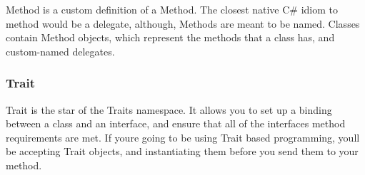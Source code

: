 Method is a custom definition of a Method. The closest native C\# idiom to method would be a {\ttfamily delegate}, although, Methods are meant to be named. Classes contain Method objects, which represent the methods that a class has, and custom-\/named delegates.

\subsubsection*{Trait}

Trait is the star of the Traits namespace. It allows you to set up a binding between a class and an interface, and ensure that all of the interface\textquotesingle{}s method requirements are met. If you\textquotesingle{}re going to be using Trait based programming, you\textquotesingle{}ll be accepting Trait objects, and instantiating them before you send them to your method. 